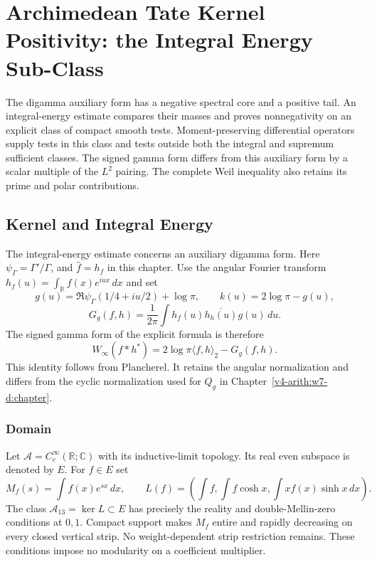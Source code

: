 \chapter{Archimedean Tate Kernel Positivity: the Integral Energy Sub-Class}
\label{v4-arith:w7-e:chapter}

The digamma auxiliary form has a negative spectral core and a positive
tail. An integral-energy estimate compares their masses and proves
nonnegativity on an explicit class of compact smooth tests.
Moment-preserving differential operators supply tests in this class
and tests outside both the integral and supremum sufficient classes.
The signed gamma form differs from this auxiliary form by a scalar
multiple of the $L^2$ pairing. The complete Weil inequality also
retains its prime and polar contributions.

\section{Kernel and Integral Energy}
\label{v4-arith:w7-e:context}
The integral-energy estimate concerns an auxiliary digamma form.
Here $\psi_\Gamma=\Gamma'/\Gamma$, and $\widehat f=h_f$ in this chapter.
Use the angular Fourier transform
$h_f(u)=\int_{\mathbb R}f(x)e^{iux}\,dx$ and set
\[
 g(u)=\Re\psi_\Gamma(1/4+iu/2)+\log\pi,\qquad
 k(u)=2\log\pi-g(u),
\]
\[
 G_g(f,h)=\frac1{2\pi}\int h_f(u)\overline{h_h(u)}g(u)\,du.
\]
The signed gamma form of the explicit formula is therefore
\[
 W_\infty(f*h^*)=2\log\pi\langle f,h\rangle_2-G_g(f,h).
\]
This identity follows from Plancherel. It retains the angular
normalization and differs from the cyclic normalization used for
$Q_g$ in Chapter~\ref{v4-arith:w7-d:chapter}.

\subsection{Domain}
\label{v4-arith:w7-e:domain}
Let $\mathscr A=C_c^\infty(\mathbb R;\mathbb C)$ with its
inductive-limit topology. Its real even subspace is denoted by $E$.
For $f\in E$ set
\[
 M_f(s)=\int f(x)e^{sx}\,dx,\qquad
 L(f)=\left(\int f,\int f\cosh x,\int xf(x)\sinh x\,dx\right).
\]
The class $\mathscr A_{13}=\ker L\subset E$ has precisely the
reality and double-Mellin-zero conditions at $0,1$.
Compact support makes $M_f$ entire and rapidly decreasing on every
closed vertical strip. No weight-dependent strip restriction remains.
These conditions impose no modularity on a coefficient multiplier.

